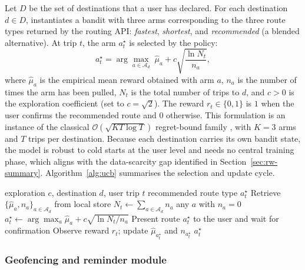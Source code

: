 \documentclass[a4paper,fleqn]{cas-sc}
\begin{document}
	Let $D$ be the set of destinations that a user has declared. For each destination $d\in D$, \RUTAI{} instantiates a bandit with three arms corresponding to the three route types returned by the routing API: \emph{fastest}, \emph{shortest}, and \emph{recommended} (a blended alternative). At trip $t$, the arm $a^\star_t$ is selected by the \UCB{} policy:
	\begin{equation}\label{eq:ucb}
		a^\star_t = \arg\max_{a\in\mathcal{A}_d}\; \hat{\mu}_{a} + c\sqrt{\frac{\ln N_t}{n_a}},
	\end{equation}
	where $\hat{\mu}_a$ is the empirical mean reward obtained with arm $a$, $n_a$ is the number of times the arm has been pulled, $N_t$ is the total number of trips to $d$, and $c>0$ is the exploration coefficient (set to $c=\sqrt{2}$). The reward $r_t\in\{0,1\}$ is $1$ when the user confirms the recommended route and $0$ otherwise. This formulation is an instance of the classical $\mathcal{O}(\sqrt{K T \log T})$ regret-bound family \citep{bouneffouf2020mabsurvey,zeng2016mab}, with $K{=}3$ arms and $T$ trips per destination. Because each destination carries its own bandit state, the model is robust to cold starts at the user level and needs no central training phase, which aligns with the data-scarcity gap identified in Section~\ref{sec:rw-summary}. Algorithm~\ref{alg:ucb} summarises the selection and update cycle.
	
	\begin{algorithm}[t]
		\caption{UCB-based route-type selection for a destination $d$}
		\label{alg:ucb}
		\begin{algorithmic}[1]
			\Require exploration $c$, destination $d$, user trip $t$
			\Ensure recommended route type $a^\star_t$
			\State Retrieve $\{\hat{\mu}_a, n_a\}_{a\in\mathcal{A}_d}$ from local store
			\State $N_t \gets \sum_{a\in\mathcal{A}_d} n_a$
			\State \Return any $a$ with $n_a=0$ 
			\EndIf
			\State $a^\star_t \gets \arg\max_a \hat{\mu}_a + c\sqrt{\ln N_t / n_a}$
			\State Present route $a^\star_t$ to the user and wait for confirmation
			\State Observe reward $r_t$; update $\hat{\mu}_{a^\star_t}$ and $n_{a^\star_t}$
			\State \Return $a^\star_t$
		\end{algorithmic}
	\end{algorithm}
	
	\subsubsection{Geofencing and reminder module}\label{sec:geo}
	
\end{document}
